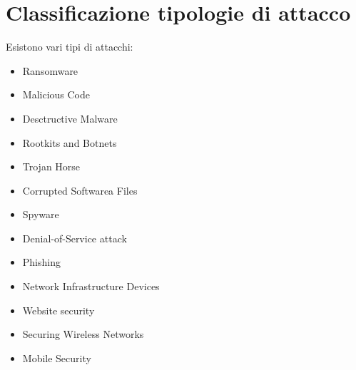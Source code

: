 \section{Classificazione tipologie di attacco}
Esistono vari tipi di attacchi:
\begin{itemize}
    \item Ransomware
    \item Malicious Code
    \item Desctructive Malware
    \item Rootkits and Botnets
    \item Trojan Horse
    \item Corrupted Softwarea Files
    \item Spyware
    \item Denial-of-Service attack
    \item Phishing
    \item Network Infrastructure Devices
    \item Website security
    \item Securing Wireless Networks
    \item Mobile Security
\end{itemize}

